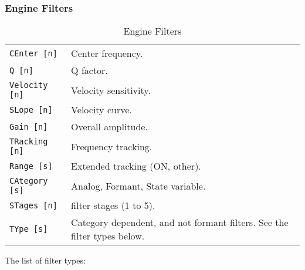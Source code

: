 \subsubsection{Engine Filters}
\label{subsec:command_line_engine_filters}

   \begin{table}[H]
      \centering
      \caption{Engine Filters}
      \label{table:yoshimi_engine_filters}
      \begin{tabular}{l l}

\texttt{CEnter [n]} &
   Center frequency. \\
\texttt{Q [n]} &
   Q factor.   \\
\texttt{Velocity [n]} &
   Velocity sensitivity.   \\
\texttt{SLope [n]} &
   Velocity curve.   \\
\texttt{Gain [n]} &
   Overall amplitude.   \\
\texttt{TRacking [n]} &
   Frequency tracking.  \\
\texttt{Range [s]} &
   Extended tracking (ON, {other}). \\
\texttt{CAtegory [s]} &
   Analog, Formant, State variable. \\
\texttt{STages [n]} &
   filter stages (1 to 5). \\
\texttt{TYpe [s]} &
   Category dependent, and not formant filters.  See the filter types below.   \\

      \end{tabular}
   \end{table}

   The list of filter types:

